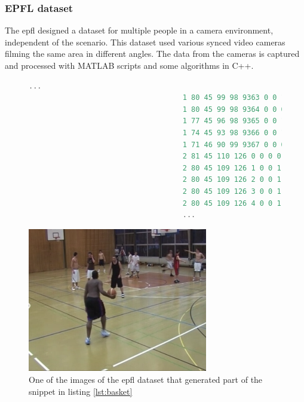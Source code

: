 \subsubsection{EPFL dataset}
The \gls{epfl} designed a dataset for multiple people in a camera environment, independent of the scenario. This dataset used various synced video cameras filming the same area in different angles. The data from the cameras is captured and processed with MATLAB scripts and some algorithms in C++.

\begin{figure}
\begin{center}
	\begin{lstlisting}[label={lst:basket}, caption={EPFL dataset file snippet.},language=c++]
									...
									1 80 45 99 98 9363 0 0 1 "PERSON"
									1 80 45 99 98 9364 0 0 0 "PERSON"
									1 77 45 96 98 9365 0 0 1 "PERSON"
									1 74 45 93 98 9366 0 0 1 "PERSON"
									1 71 46 90 99 9367 0 0 0 "PERSON"
									2 81 45 110 126 0 0 0 0 "PERSON"
									2 80 45 109 126 1 0 0 1 "PERSON"
									2 80 45 109 126 2 0 0 1 "PERSON"
									2 80 45 109 126 3 0 0 1 "PERSON"
									2 80 45 109 126 4 0 0 1 "PERSON"
									...	\end{lstlisting}
\end{center}
\end{figure}

\begin{figure}[htp]
	
	\centering
	\includegraphics[width=0.7\textwidth]{capstate/imgs/basket.png}
	
	\caption{One of the images of the \gls{epfl} dataset that generated part of the snippet in listing \ref{lst:basket} }
	\label{fig:basketimg}
	
\end{figure}


